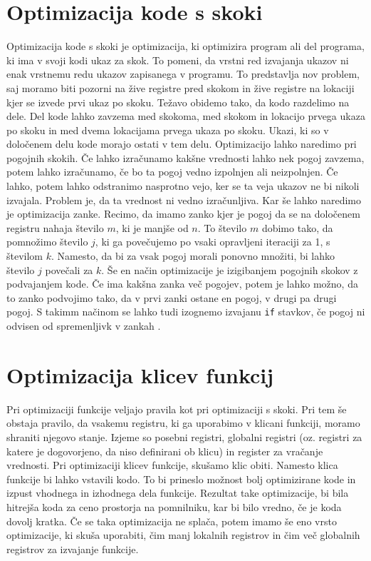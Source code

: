 \documentclass[a4paper, 12pt]{book}
\begin{document}
\section{Optimizacija kode s skoki}
Optimizacija kode s skoki je optimizacija, ki optimizira program ali del programa, ki ima v svoji kodi ukaz za skok. To pomeni, da vrstni red izvajanja ukazov ni enak vrstnemu redu ukazov zapisanega v programu. To predstavlja nov problem, saj moramo biti pozorni na žive registre pred skokom in žive registre na lokaciji kjer se izvede prvi ukaz po skoku. Težavo obidemo tako, da kodo razdelimo na dele. Del kode lahko zavzema med skokoma, med skokom in lokacijo prvega ukaza po skoku in med dvema lokacijama prvega ukaza po skoku. Ukazi, ki so v določenem delu kode morajo ostati v tem delu. Optimizacijo lahko naredimo pri pogojnih skokih. Če lahko izračunamo kakšne vrednosti lahko nek pogoj zavzema, potem lahko izračunamo, če bo ta pogoj vedno izpolnjen ali neizpolnjen. Če lahko, potem lahko odstranimo nasprotno vejo, ker se ta veja ukazov ne bi nikoli izvajala. Problem je, da ta vrednost ni vedno izračunljiva. Kar še lahko naredimo je optimizacija zanke. Recimo, da imamo zanko kjer je pogoj da se na določenem registru nahaja število \(m\), ki je manjše od \(n\). To število \(m\) dobimo tako, da pomnožimo število \(j\), ki ga povečujemo po vsaki opravljeni iteraciji za 1, s številom \(k\). Namesto, da bi za vsak pogoj morali ponovno množiti, bi lahko število \(j\) povečali za \(k\). Še en način optimizacije je izigibanjem pogojnih skokov z podvajanjem kode. Če ima kakšna zanka več pogojev, potem je lahko možno, da to zanko podvojimo tako, da v prvi zanki ostane en pogoj, v drugi pa drugi pogoj. S takimm načinom se lahko tudi izognemo izvajanu \texttt{if} stavkov, če pogoj ni odvisen od spremenljivk v zankah \cite{avoid}.
\section{Optimizacija klicev funkcij}
Pri optimizaciji funkcije veljajo pravila kot pri optimizaciji s skoki. Pri tem še obstaja pravilo, da vsakemu registru, ki ga uporabimo v klicani funkciji, moramo shraniti njegovo stanje. Izjeme so posebni registri, globalni registri (oz. registri za katere je dogovorjeno, da niso definirani ob klicu) in register za vračanje vrednosti. Pri optimizaciji klicev funkcije, skušamo klic obiti. Namesto klica funkcije bi lahko vstavili kodo. To bi prineslo možnost bolj optimizirane kode in izpust vhodnega in izhodnega dela funkcije. Rezultat take optimizacije, bi bila hitrejša koda za ceno prostorja na pomnilniku, kar bi bilo vredno, če je koda dovolj kratka. Če se taka optimizacija ne splača, potem imamo še eno vrsto optimizacije, ki skuša uporabiti, čim manj lokalnih registrov in čim več globalnih registrov za izvajanje funkcije.  
\end{document}
